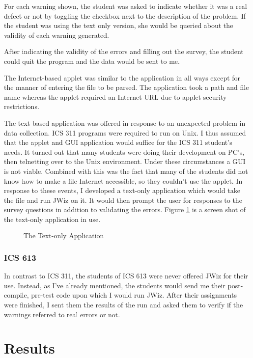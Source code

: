 For each warning shown, the student was asked to indicate whether it was a
real defect or not by toggling the checkbox next to the description of the
problem.  If the student was using the text only version, she would be
queried about the validity of each warning generated.

After indicating the validity of the errors and filling out the survey, the
student could quit the program and the data would be sent to me.

The Internet-based applet was similar to the application in all ways except for
the manner of entering the file to be parsed.  The application took a
path and file name whereas the applet required an Internet URL due to
applet security restrictions.

The text based application was offered in response to an unexpected problem
in data collection.  ICS 311 programs were required to run on Unix.  I thus
assumed that the applet and GUI application would suffice for the ICS 311
student's needs.  It turned out that many students were doing their
development on PC's, then telnetting over to the Unix environment.  Under
these circumstances a GUI is not viable.  Combined with this was the fact
that many of the students did not know how to make a file Internet
accessible, so they couldn't use the applet.  In response to these events,
I developed a text-only application which would take the file and run JWiz
on it.  It would then prompt the user for responses to the survey questions
in addition to validating the errors.  Figure \ref{TextApplication} is a
screen shot of the text-only application in use.

\begin{figure}[tbp]
  {\centerline{}}
  \caption{The Text-only Application}
  \label{TextApplication}
\end{figure}

\subsection{ICS 613}
In contrast to ICS 311, the students of ICS 613 were never offered JWiz for
their use.  Instead, as I've already mentioned, the students would send me
their post-compile, pre-test code upon which I would run JWiz.  After their
assignments were finished, I sent them the results of the run and asked
them to verify if the warnings referred to real errors or not.


\chapter{Results}
